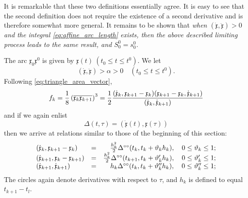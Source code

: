 \documentclass[11pt]{book} \usepackage{amssymb}
\newcommand{\myvec}[1]{\mathfrak{#1}}
\newcommand{\vecx}{\myvec{x}}
\newcommand{\vecderiv}[1]{\dot{\myvec{#1}}}
\newcommand{\vecderivv}[1]{\ddot{\myvec{#1}}}
\begin{document}
It is remarkable that these two definitions essentially agree. It is easy to
see that the second definition does not require the existence of a second
derivative and is therefore somewhat more general. It remains to be shown that
{\em when $(\vecderiv{x},\vecderivv{x})>0$ and the integral 
  \eqref{eq:affine_arc_length} exists, then the above described limiting 
  process leads to the same result, and $S_0^0=s_0^0$.}

The arc $\vecx_0\vecx^0$ is given by $\vecx(t)\:(t_0\leq t \leq t^0)$. We let
\begin{equation}
  \label{eq:bound_curvature}
  (\vecderiv{x},\vecderivv{x})>\alpha>0 \quad (t_0\leq t \leq t^0).
\end{equation}
Following \eqref{eq:triangle_area_vector},
\begin{equation}
  \label{eq:kth_segment_len}
  f_k={1\over 8}\left(\overline{\vecx_k\vecx_{k+1}}\right)^3
  = {1 \over 2}
  { (\vecderiv{x}_k,\vecx_{k+1}-\vecx_k)
    (\vecx_{k+1}-\vecx_k,\vecderiv{x}_{k+1})
    \over
    (\vecderiv{x}_k,\vecderiv{x}_{k+1})
  }
\end{equation}
and if we again enlist
\begin{equation}
  \label{eq:delta}
  \Delta(t,\tau)=(\vecderiv{x}(t),\vecx(\tau))
\end{equation}
then we arrive at relations similar to those of the beginning of this section:
\begin{equation}
  \label{eq:delta_relations}
  \begin{array}{lcr}
    (\vecderiv{x}_k,\vecx_{k+1}-\vecx_k)&=&{h_k^2\over 2}\Delta^{\circ\circ}(t_k,t_k+\vartheta_kh_k),\quad 0\leq \vartheta_k\leq 1;\\
    (\vecderiv{x}_{k+1},\vecx_k-\vecx_{k+1})&=&{h_k^2\over 2}\Delta^{\circ\circ}(t_{k+1},t_k+\vartheta'_kh_k),\quad 0\leq \vartheta'_k\leq 1;\\
    (\vecderiv{x}_{k+1},\vecderiv{x}_{k+1})&=&h_k\Delta^{\circ\circ}(t_k,t_k+\vartheta''_kh_k),\quad 0\leq \vartheta''_k\leq 1;
  \end{array}
\end{equation}
The circles again denote derivatives with respect to $\tau$, and $h_k$ is
defined to equal $t_{k+1}-t_l$.
\end{document}
